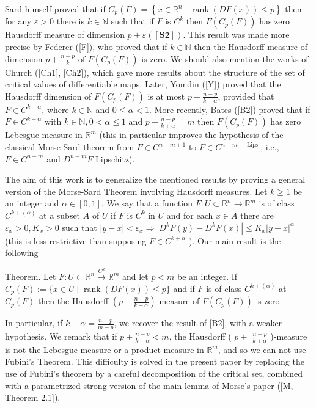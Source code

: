 \documentclass[10pt]{article}
\begin{document}
Sard himself proved that if $C_{p}(F)=\left\{x \in \mathbb{R}^{n} \mid \operatorname{rank}(D F(x)) \leq p\right\}$ then for any $\varepsilon>0$ there is $k \in \mathbb{N}$ such that if $F$ is $C^{k}$ then $F\left(C_{p}(F)\right)$ has zero Hausdorff measure of dimension $p+\varepsilon([\mathbf{S 2}])$. This result was made more precise by Federer ([F]), who proved that if $k \in \mathbb{N}$ then the Hausdorff measure of dimension $p+\frac{n-p}{k}$ of $F\left(C_{p}(F)\right)$ is zero. We should also mention the works of Church ([Ch1], [Ch2]), which gave more results about the structure of the set of critical values of differentiable maps. Later, Yomdin ([Y]) proved that the Hausdorff dimension of $F\left(C_{p}(F)\right)$ is at most $p+\frac{n-p}{k+\alpha}$, provided that $F \in C^{k+\alpha}$, where $k \in \mathbb{N}$ and $0 \leq \alpha<1$. More recently, Bates ([B2]) proved that if $F \in C^{k+\alpha}$ with $k \in \mathbb{N}, 0<\alpha \leq 1$ and $p+\frac{n-p}{k+\alpha}=m$ then $F\left(C_{p}(F)\right)$ has zero Lebesgue measure in $\mathbb{R}^{m}$ (this in particular improves the hypothesis of the classical Morse-Sard theorem from $F \in C^{n-m+1}$ to $F \in C^{n-m+\text { Lips }}$, i.e., $F \in C^{n-m}$ and $D^{n-m} F$ Lipschitz).

The aim of this work is to generalize the mentioned results by proving a general version of the Morse-Sard Theorem involving Hausdorff measures. Let $k \geq 1$ be an integer and $\alpha \in[0,1]$. We say that a function $F: U \subset \mathbb{R}^{n} \rightarrow \mathbb{R}^{m}$ is of class $C^{k+(\alpha)}$ at a subset $A$ of $U$ if $F$ is $C^{k}$ in $U$ and for each $x \in A$ there are $\varepsilon_{x}>0, K_{x}>0$ such that $|y-x|<\varepsilon_{x} \Rightarrow\left|D^{k} F(y)-D^{k} F(x)\right| \leq K_{x}|y-x|^{\alpha}$ (this is less restrictive than supposing $F \in C^{k+\alpha}$ ). Our main result is the following

Theorem. Let $F: U \subset \mathbb{R}^{n} \xrightarrow{C^{k}} \mathbb{R}^{m}$ and let $p<m$ be an integer. If $C_{p}(F):=\{x \in U \mid \operatorname{rank}(D F(x)) \leq p\}$ and if $F$ is of class $C^{k+(\alpha)}$ at $C_{p}(F)$ then the Hausdorff $\left(p+\frac{n-p}{k+\alpha}\right)$-measure of $F\left(C_{p}(F)\right)$ is zero.

In particular, if $k+\alpha=\frac{n-p}{m-p}$, we recover the result of [B2], with a weaker hypothesis. We remark that if $p+\frac{n-p}{k+\alpha}<m$, the Hausdorff ( $p+$ $\frac{n-p}{k+\alpha}$ )-measure is not the Lebesgue measure or a product measure in $\mathbb{R}^{m}$, and so we can not use Fubini's Theorem. This difficulty is solved in the present paper by replacing the use of Fubini's theorem by a careful decomposition of the critical set, combined with a parametrized strong version of the main lemma of Morse's paper ([M, Theorem 2.1]).
\end{document}
